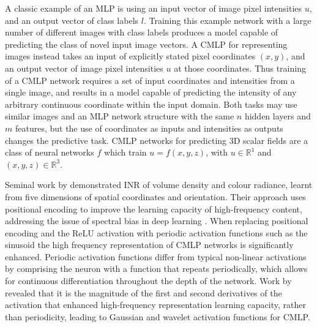 \documentclass[manuscript.tex]{subfiles}
\begin{document}
A classic example of an MLP is using an input vector of image pixel intensities \(u\), and an output vector of class labels \(l\).
Training this example network with a large number of different images with class labels produces a model capable of predicting the class of novel input image vectors.
A CMLP for representing images instead takes an input of explicitly stated pixel coordinates \((x,y)\), and an output vector of image pixel intensities \(u\) at those coordinates.
Thus training of a CMLP network requires a set of input coordinates and intensities from a single image, and results in a model capable of predicting the intensity of any arbitrary continuous coordinate within the input domain.
Both tasks may use similar images and an MLP network structure with the same \(n\) hidden layers and \(m\) features, but the use of coordinates as inputs and intensities as outputs changes the predictive task.
CMLP networks for predicting 3D scalar fields are a class of neural networks \(f\) which train \(u = f(x,y,z)\), with \(u\in\mathbb{R}^1\) and \((x,y,z)\in\mathbb{R}^3\).

Seminal work by \textcite{mildenhallNeRFRepresentingScenes2020} demonstrated INR of volume density and colour radiance, learnt from five dimensions of spatial coordinates and orientation.
Their approach uses positional encoding to improve the learning capacity of high-frequency content, addressing the issue of spectral bias in deep learning \parencite{rahamanSpectralBiasNeural2019}.
When replacing positional encoding and the ReLU activation with periodic activation functions such as the sinusoid \parencite{sitzmann2019siren} the high frequency representation of CMLP networks is significantly enhanced.
Periodic activation functions differ from typical non-linear activations by comprising the neuron with a function that repeats periodically, which allows for continuous differentiation throughout the depth of the network.
Work by \textcite{ramasinghePeriodicityUnifyingFramework2022} revealed that it is the magnitude of the first and second derivatives of the activation that enhanced high-frequency representation learning capacity, rather than periodicity, leading to Gaussian \parencite{ramasinghePeriodicityUnifyingFramework2022} and wavelet \parencite{saragadamWIREWaveletImplicit2023} activation functions for CMLP\@.
\end{document}
